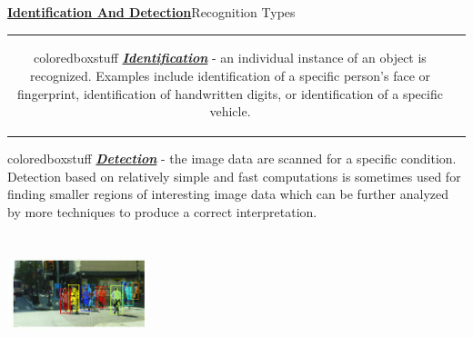 \documentclass{beamer}
\begin{document}
{\begin{frame}{\textbf{\underline{Identification And Detection}}}{Recognition Types}
\begin{tabular}{cc}
\begin{minipage}{4cm}
	\end{minipage}
	\begin{minipage}{6cm}
		\setbeamercolor{coloredboxstuff}{fg=black,bg=pink!20}
		\begin{beamercolorbox}[wd=6cm]{coloredboxstuff}
			\underline{\large \textbf{\textit{{Identification}}}} - an individual instance of an object is recognized. Examples include identification of a specific person's face or fingerprint, identification of handwritten digits, or identification of a specific vehicle.\pause
		\end{beamercolorbox}
	\end{minipage}
	
\end{tabular}
\begin{minipage}{7cm}
	\begin{beamercolorbox}[wd=7cm]{coloredboxstuff}
		\underline{\large \textbf{\textit{Detection}}} - the image data are scanned for a specific condition.
		Detection based on relatively simple and fast computations is sometimes used for finding smaller regions of interesting image data which can be further analyzed by more techniques to produce a correct interpretation.
	\end{beamercolorbox}
\end{minipage}
\begin{minipage}{3cm}
	\includegraphics[height=3.5cm,
	width=4cm]{Detect1.jpeg}
\end{minipage}

\end{frame}


}
\end{document}
